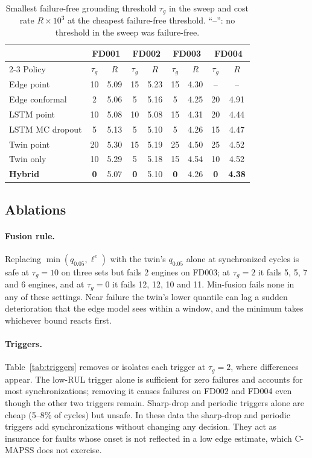 \documentclass[preprint,12pt,authoryear]{elsarticle}
\newcommand{\botrule}{\bottomrule}
\begin{document}
\begin{table}[t]
\caption{Smallest failure-free grounding threshold $\tau_g$ in the sweep and cost rate $R\times10^3$ at the cheapest failure-free threshold. ``--'': no threshold in the sweep was failure-free.}\label{tab:safe}
\begin{tabular*}{\textwidth}{@{\extracolsep\fill}lcccccccc}
\toprule
& \multicolumn{2}{c}{FD001} & \multicolumn{2}{c}{FD002} & \multicolumn{2}{c}{FD003} & \multicolumn{2}{c}{FD004} \\
\cmidrule{2-3}\cmidrule{4-5}\cmidrule{6-7}\cmidrule{8-9}
Policy & $\tau_g$ & $R$ & $\tau_g$ & $R$ & $\tau_g$ & $R$ & $\tau_g$ & $R$ \\
\midrule
Edge point      & 10 & 5.09 & 15 & 5.23 & 15 & 4.30 & -- & -- \\
Edge conformal  & 2  & 5.06 & 5  & 5.16 & 5  & 4.25 & 20 & 4.91 \\
LSTM point      & 10 & 5.08 & 10 & 5.08 & 15 & 4.31 & 20 & 4.44 \\
LSTM MC dropout & 5  & 5.13 & 5  & 5.10 & 5  & 4.26 & 15 & 4.47 \\
Twin point      & 20 & 5.30 & 15 & 5.19 & 25 & 4.50 & 25 & 4.52 \\
Twin only       & 10 & 5.29 & 5  & 5.18 & 15 & 4.54 & 10 & 4.52 \\
\textbf{Hybrid} & \textbf{0} & 5.07 & \textbf{0} & 5.10 & \textbf{0} & 4.26 & \textbf{0} & \textbf{4.38} \\
\botrule
\end{tabular*}
\end{table}

\subsection{Ablations}
\paragraph{Fusion rule.} Replacing $\min(q_{0.05}, \ell^{e})$ with the twin's $q_{0.05}$ alone at synchronized cycles is safe at $\tau_g = 10$ on three sets but fails 2 engines on FD003; at $\tau_g = 2$ it fails 5, 5, 7 and 6 engines, and at $\tau_g = 0$ it fails 12, 12, 10 and 11. Min-fusion fails none in any of these settings. Near failure the twin's lower quantile can lag a sudden deterioration that the edge model sees within a window, and the minimum takes whichever bound reacts first.

\paragraph{Triggers.} Table~\ref{tab:triggers} removes or isolates each trigger at $\tau_g = 2$, where differences appear. The low-RUL trigger alone is sufficient for zero failures and accounts for most synchronizations; removing it causes failures on FD002 and FD004 even though the other two triggers remain. Sharp-drop and periodic triggers alone are cheap (5--8\% of cycles) but unsafe. In these data the sharp-drop and periodic triggers add synchronizations without changing any decision. They act as insurance for faults whose onset is not reflected in a low edge estimate, which C-MAPSS does not exercise.
\end{document}
